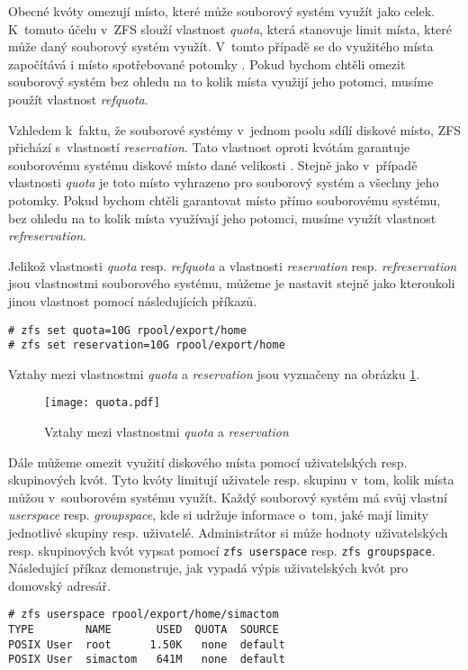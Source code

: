 Obecné kvóty omezují místo, které může souborový systém využít jako celek. K~tomuto účelu v~ZFS slouží vlastnost \emph{quota}, která stanovuje limit místa, které může daný souborový systém využít. V~tomto případě se do využitého místa započítává i místo spotřebované potomky \cite{quotas}. Pokud bychom chtěli omezit souborový systém bez ohledu na to kolik místa využijí jeho potomci, musíme použít vlastnost \emph{refquota}.

Vzhledem k~faktu, že souborové systémy v~jednom poolu sdílí diskové místo, ZFS přichází s~vlastností \emph{reservation}. Tato vlastnost oproti kvótám garantuje souborovému systému diskové místo dané velikosti \cite{quotas}. Stejně jako v~případě vlastnosti \emph{quota} je toto místo vyhrazeno pro souborový systém a všechny jeho potomky. Pokud bychom chtěli garantovat místo přímo souborovému systému, bez ohledu na to kolik místa využívají jeho potomci, musíme využít vlastnost \emph{refreservation}.

Jelikož vlastnosti \emph{quota} resp. \emph{refquota} a vlastnosti \emph{reservation} resp. \emph{refreservation} jsou vlastnostmi souborového systému, můžeme je nastavit stejně jako kteroukoli jinou vlastnost pomocí následujících příkazů.
\begin{verbatim}
# zfs set quota=10G rpool/export/home
# zfs set reservation=10G rpool/export/home
\end{verbatim}

Vztahy mezi vlastnostmi \emph{quota} a \emph{reservation} jsou vyznačeny na obrázku \ref{quotavsreserv}.
\begin{figure}
    \centering
    \texttt{[image: quota.pdf]}
    \caption{Vztahy mezi vlastnostmi \emph{quota} a \emph{reservation}}
    \label{quotavsreserv}
\end{figure}

Dále můžeme omezit využití diskového místa pomocí uživatelských resp. skupinových kvót. Tyto kvóty limitují uživatele resp. skupinu v~tom, kolik místa můžou v~souborovém systému využít. Každý souborový systém má svůj vlastní \emph{userspace} resp. \emph{groupspace}, kde si udržuje informace o~tom, jaké mají limity jednotlivé skupiny resp. uživatelé.
Administrátor si může hodnoty uživatelských resp. skupinových kvót vypsat pomocí \verb|zfs userspace| resp. \verb|zfs groupspace|. Následující příkaz demonstruje, jak vypadá výpis uživatelských kvót pro domovský adresář.
\begin{verbatim}
# zfs userspace rpool/export/home/simactom
TYPE        NAME       USED  QUOTA  SOURCE
POSIX User  root      1.50K   none  default
POSIX User  simactom   641M   none  default
\end{verbatim}

